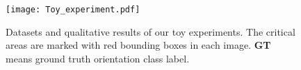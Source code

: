 \documentclass[10pt,twocolumn,letterpaper]{article}
\begin{document}




\begin{figure}%
\centering
\texttt{[image: Toy\_experiment.pdf]} %
\caption{Datasets and qualitative results of our toy experiments. The critical areas are marked with red bounding boxes in each image. \textbf{GT} means ground truth orientation class label.}
\label{fig:toy_experients}
\end{figure}
\end{document}
